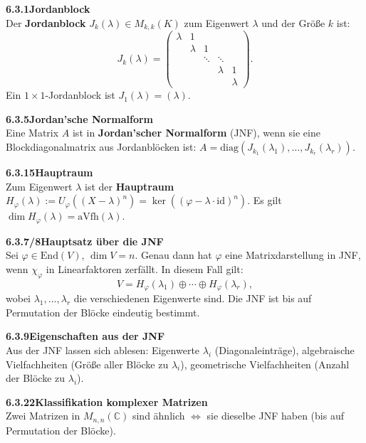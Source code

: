 \documentclass[a4paper,12pt]{article}
\newcommand{\gentry}[3]{%
  \noindent\textbf{#1\quad #2}\nopagebreak\\[0.2em]
  #3\par\smallskip
}
\begin{document}
\gentry{6.3.1}{Jordanblock}{%
  Der \textbf{Jordanblock} $J_k(\lambda) \in M_{k,k}(K)$ zum Eigenwert $\lambda$ und der Größe $k$ ist:
  \[
    J_k(\lambda) = \begin{pmatrix}\lambda&1&&&\\&\lambda&1&&\\&&\ddots&\ddots&\\&&&\lambda&1\\&&&&\lambda\end{pmatrix}.
  \]
  Ein $1 \times 1$-Jordanblock ist $J_1(\lambda) = (\lambda)$.
}

\gentry{6.3.5}{Jordan'sche Normalform}{%
  Eine Matrix $A$ ist in \textbf{Jordan'scher Normalform} (JNF), wenn sie eine Blockdiagonalmatrix aus Jordanblöcken ist: $A = \mathrm{diag}(J_{k_1}(\lambda_1), \ldots, J_{k_r}(\lambda_r))$.
}

\gentry{6.3.15}{Hauptraum}{%
  Zum Eigenwert $\lambda$ ist der \textbf{Hauptraum} $H_\varphi(\lambda) := U_\varphi((X-\lambda)^n) = \ker((\varphi - \lambda \cdot \mathrm{id})^n)$.
  Es gilt $\dim H_\varphi(\lambda) = \mathrm{aVfh}(\lambda)$.
}

\gentry{6.3.7/8}{Hauptsatz über die JNF}{%
  Sei $\varphi \in \mathrm{End}(V)$, $\dim V = n$. Genau dann hat $\varphi$ eine Matrixdarstellung in JNF, wenn $\chi_\varphi$ in Linearfaktoren zerfällt. In diesem Fall gilt:
  \[
    V = H_\varphi(\lambda_1) \oplus \cdots \oplus H_\varphi(\lambda_r),
  \]
  wobei $\lambda_1, \ldots, \lambda_r$ die verschiedenen Eigenwerte sind. Die JNF ist bis auf Permutation der Blöcke eindeutig bestimmt.
}

\gentry{6.3.9}{Eigenschaften aus der JNF}{%
  Aus der JNF lassen sich ablesen: Eigenwerte $\lambda_i$ (Diagonaleinträge), algebraische Vielfachheiten (Größe aller Blöcke zu $\lambda_i$), geometrische Vielfachheiten (Anzahl der Blöcke zu $\lambda_i$).
}

\gentry{6.3.22}{Klassifikation komplexer Matrizen}{%
  Zwei Matrizen in $M_{n,n}(\mathbb{C})$ sind ähnlich $\iff$ sie dieselbe JNF haben (bis auf Permutation der Blöcke).
}
\end{document}
